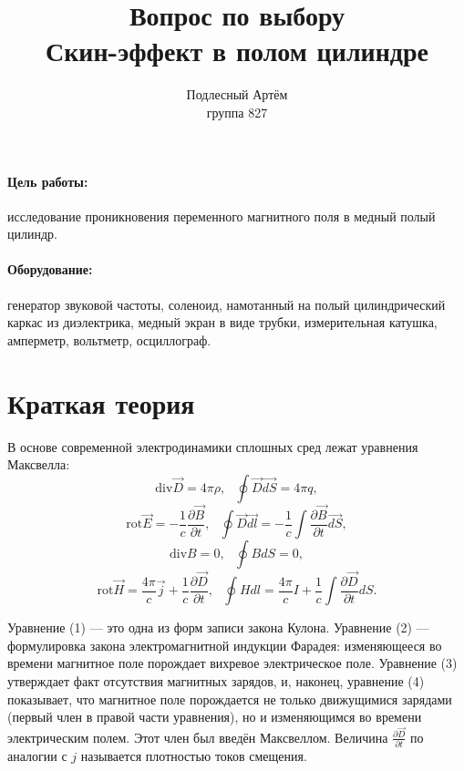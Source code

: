 \documentclass[a4paper, 14pt]{extarticle}%
\author{Подлесный Артём \\ группа 827}
\title{Вопрос по выбору \\ Скин-эффект в полом цилиндре}
\begin{document}
\maketitle

\paragraph*{Цель работы:} исследование проникновения переменного магнитного поля
в медный полый цилиндр.
\paragraph*{Оборудование:} генератор звуковой частоты, соленоид, намотанный на полый цилиндрический каркас из диэлектрика, медный экран
в виде трубки, измерительная катушка, амперметр, вольтметр, осциллограф.

\section*{Краткая теория}

В основе современной электродинамики сплошных сред лежат уравнения Максвелла: 
\begin{equation}
\text{div}\overrightarrow{D} = 4\pi \rho, \text{     }\oint \overrightarrow{D}\overrightarrow{dS} = 4\pi q,
\end{equation} 
\begin{equation}
\text{rot}\overrightarrow{E} = -\dfrac{1}{c}\dfrac{\partial\overrightarrow{B}}{\partial t}, \text{     }\oint \overrightarrow{D}\overrightarrow{dl} = - \dfrac{1}{c}\int \dfrac{\partial\overrightarrow{B}}{\partial t} \overrightarrow{dS} ,
\end{equation} 
\begin{equation}
\text{div} B = 0, \text{   } \oint BdS = 0,
\end{equation}
\begin{equation}
\text{rot} \overrightarrow{H} = \frac{4\pi}{c}\overrightarrow{j} + \dfrac{1}{c}\dfrac{\partial\overrightarrow{D}}{\partial t}  , \text{   } \oint Hdl =\frac{4\pi}{c}I +\dfrac{1}{c}\int \dfrac{\partial\overrightarrow{D}}{\partial t}dS.
\end{equation}

Уравнение (1) — это одна из форм записи закона Кулона. Уравнение (2) —
формулировка закона электромагнитной индукции Фарадея: изменяющееся
во времени магнитное поле порождает вихревое электрическое поле. Уравнение (3) утверждает факт отсутствия магнитных зарядов, и, наконец, уравнение (4) показывает, что магнитное поле порождается не только движущимися
зарядами (первый член в правой части уравнения), но
и изменяющимся во времени электрическим полем. Этот член был введён Максвеллом. Величина $\frac{\partial\overrightarrow{D}}{\partial t}$ по аналогии с $j$ называется плотностью токов смещения.
\end{document}
